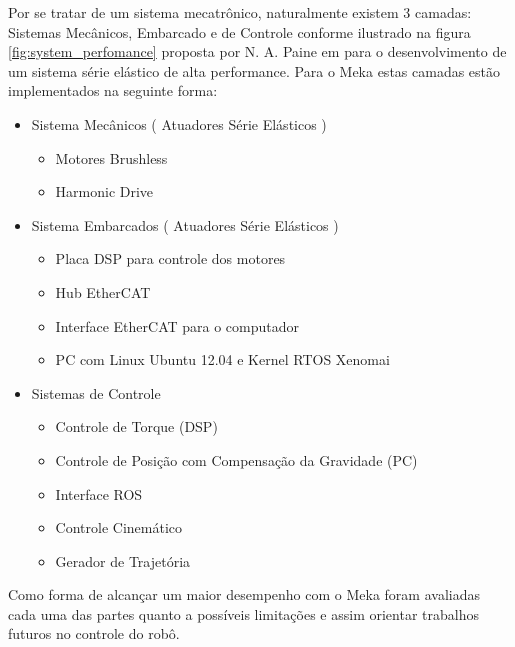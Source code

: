 Por se tratar de um sistema mecatrônico, naturalmente existem 3 camadas: Sistemas Mecânicos,  Embarcado e de Controle conforme ilustrado na figura \ref{fig:system_perfomance} proposta por N. A. Paine em \cite{paine2014high} para o desenvolvimento de um sistema série elástico de alta performance. Para o Meka estas camadas estão implementados na seguinte forma:

\begin{itemize}
    \item Sistema Mecânicos ( Atuadores Série Elásticos )
    \begin{itemize}
        \item Motores Brushless
        \item Harmonic Drive
    \end{itemize}
    \item Sistema Embarcados ( Atuadores Série Elásticos )
    \begin{itemize}
        \item Placa DSP para controle dos motores
        \item Hub EtherCAT
        \item Interface EtherCAT para o computador
        \item PC com Linux Ubuntu 12.04 e Kernel RTOS Xenomai
    \end{itemize}
    \item Sistemas de Controle
    \begin{itemize}
        \item Controle de Torque (DSP)
        \item Controle de Posição com Compensação da Gravidade (PC)
        \item Interface ROS
        \item Controle Cinemático
        \item Gerador de Trajetória
    \end{itemize}
\end{itemize}

Como forma de alcançar um maior desempenho com o Meka foram avaliadas cada uma das partes quanto a possíveis limitações e assim orientar trabalhos futuros no controle do robô.



